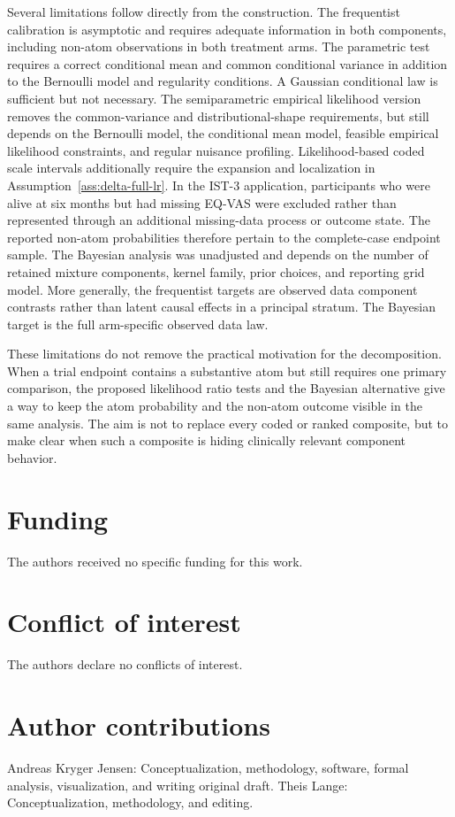 \documentclass[11pt]{article}
\begin{document}
Several limitations follow directly from the construction. The frequentist calibration is asymptotic and requires adequate information in both components, including non-atom observations in both treatment arms. The parametric test requires a correct conditional mean and common conditional variance in addition to the Bernoulli model and regularity conditions. A Gaussian conditional law is sufficient but not necessary. The semiparametric empirical likelihood version removes the common-variance and distributional-shape requirements, but still depends on the Bernoulli model, the conditional mean model, feasible empirical likelihood constraints, and regular nuisance profiling. Likelihood-based coded scale intervals additionally require the expansion and localization in Assumption~\ref{ass:delta-full-lr}. In the IST-3 application, participants who were alive at six months but had missing EQ-VAS were excluded rather than represented through an additional missing-data process or outcome state. The reported non-atom probabilities therefore pertain to the complete-case endpoint sample. The Bayesian analysis was unadjusted and depends on the number of retained mixture components, kernel family, prior choices, and reporting grid model. More generally, the frequentist targets are observed data component contrasts rather than latent causal effects in a principal stratum. The Bayesian target is the full arm-specific observed data law.

These limitations do not remove the practical motivation for the decomposition. When a trial endpoint contains a substantive atom but still requires one primary comparison, the proposed likelihood ratio tests and the Bayesian alternative give a way to keep the atom probability and the non-atom outcome visible in the same analysis. The aim is not to replace every coded or ranked composite, but to make clear when such a composite is hiding clinically relevant component behavior.

\section*{Funding}
The authors received no specific funding for this work.

\section*{Conflict of interest}
The authors declare no conflicts of interest.

\section*{Author contributions}
Andreas Kryger Jensen: Conceptualization, methodology, software, formal
analysis, visualization, and writing original draft. Theis Lange: Conceptualization, methodology, and editing.
\end{document}
